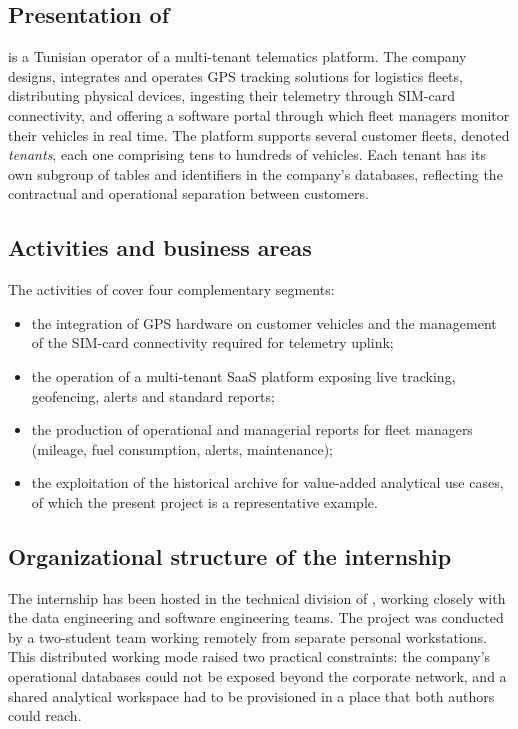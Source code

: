 \subsection{Presentation of \hostorg}
\hostorg{} is a Tunisian operator of a multi-tenant telematics platform. The company designs, integrates and operates GPS tracking solutions for logistics fleets, distributing physical devices, ingesting their telemetry through SIM-card connectivity, and offering a software portal through which fleet managers monitor their vehicles in real time. The platform supports several customer fleets, denoted \emph{tenants}, each one comprising tens to hundreds of vehicles. Each tenant has its own subgroup of tables and identifiers in the company's databases, reflecting the contractual and operational separation between customers.

\subsection{Activities and business areas}
The activities of \hostorg{} cover four complementary segments:

\begin{itemize}
    \item the integration of GPS hardware on customer vehicles and the management of the SIM-card connectivity required for telemetry uplink;
    \item the operation of a multi-tenant SaaS platform exposing live tracking, geofencing, alerts and standard reports;
    \item the production of operational and managerial reports for fleet managers (mileage, fuel consumption, alerts, maintenance);
    \item the exploitation of the historical archive for value-added analytical use cases, of which the present project is a representative example.
\end{itemize}

\subsection{Organizational structure of the internship}
\label{ssec:internship-org}
The internship has been hosted in the technical division of \hostorg, working closely with the data engineering and software engineering teams. The project was conducted by a two-student team working remotely from separate personal workstations. This distributed working mode raised two practical constraints: the company's operational databases could not be exposed beyond the corporate network, and a shared analytical workspace had to be provisioned in a place that both authors could reach.

